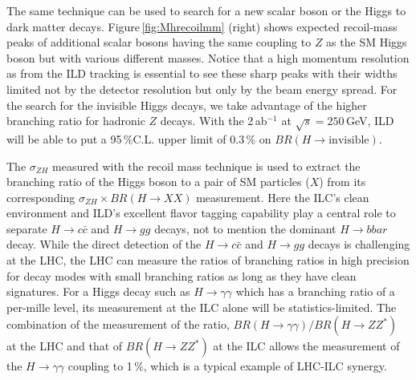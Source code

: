 The same technique can be used to search for a new scalar boson or the Higgs to dark matter decays.
Figure\,\ref{fig:Mhrecoilmm} (right) shows expected recoil-mass peaks of additional scalar bosons having the same coupling to $Z$ as the SM Higgs boson but with various different masses. 
Notice that a high momentum resolution as from the ILD tracking is essential to see these sharp peaks with their widths limited not by the detector resolution but only by the beam energy spread. For the search for the invisible Higgs decays, we take advantage of the higher branching ratio for hadronic $Z$ decays. With the 2\,ab$^{-1}$ at $\sqrt{s}=250$\,GeV, ILD will be able to put a 95\,\%C.L. upper limit of 0.3\,\% on $BR(H\to \mathrm{invisible})$\cite{Ref:Hinvisible}.
%

The $\sigma_{ZH}$ measured with the recoil mass technique is used to extract the branching ratio of the Higgs boson to a pair of SM particles ($X$) from its corresponding $\sigma_{ZH} \times BR(H \to XX)$ measurement. Here the ILC's clean environment and ILD's excellent flavor tagging capability play a central role to separate $H \to c\bar{c}$ and $H \to gg$ decays, not to mention the dominant $H \to b{bar}$ decay.
While the direct detection of the $H \to c\bar{c}$ and $H \to gg$ decays is challenging at the LHC, the LHC can measure the ratios of branching ratios in high precision for decay modes with small branching ratios as long as they have clean signatures. For a Higgs decay such as $H \to \gamma\gamma$ which has a branching ratio of a per-mille level, its measurement at the ILC alone will be statistics-limited. The combination of the measurement of the ratio, $BR(H \to \gamma\gamma)/BR(H \to ZZ^*)$ at the LHC and that of  $BR(H \to ZZ^*)$ at the ILC allows the measurement of the $H\to\gamma\gamma$ coupling to 1\,\%, which is a typical example of LHC-ILC synergy.

